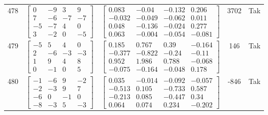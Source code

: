 \documentclass[a4paper,12pt]{article}
\begin{document}
\begin{tabular}{c c c c c}
478
&
$\begin{bmatrix} 0 & -9 & 3 & 9 \\ 7 & -6 & -7 & -7 \\ -5 & -7 & 4 & 0 \\ 3 & -2 & 0 & -5 \end{bmatrix}$
&
$\begin{bmatrix} 0.083 & -0.04 & -0.132 & 0.206 \\ -0.032 & -0.049 & -0.062 & 0.011 \\ 0.048 & -0.136 & -0.024 & 0.277 \\ 0.063 & -0.004 & -0.054 & -0.081 \end{bmatrix}$
&
3702
&
Tak
\\
479
&
$\begin{bmatrix} -5 & 5 & 4 & 0 \\ 2 & -6 & -3 & -3 \\ 1 & 9 & 4 & 8 \\ 0 & -1 & 0 & 5 \end{bmatrix}$
&
$\begin{bmatrix} 0.185 & 0.767 & 0.39 & -0.164 \\ -0.377 & -0.822 & -0.24 & -0.11 \\ 0.952 & 1.986 & 0.788 & -0.068 \\ -0.075 & -0.164 & -0.048 & 0.178 \end{bmatrix}$
&
146
&
Tak
\\
480
&
$\begin{bmatrix} -1 & -6 & 9 & -2 \\ -2 & -3 & 9 & 7 \\ -6 & 0 & -1 & 0 \\ -8 & -3 & 5 & -3 \end{bmatrix}$
&
$\begin{bmatrix} 0.035 & -0.014 & -0.092 & -0.057 \\ -0.513 & 0.105 & -0.733 & 0.587 \\ -0.213 & 0.085 & -0.447 & 0.34 \\ 0.064 & 0.074 & 0.234 & -0.202 \end{bmatrix}$
&
-846
&
Tak
\\
\end{tabular} \egroup \newpage
\end{document}
